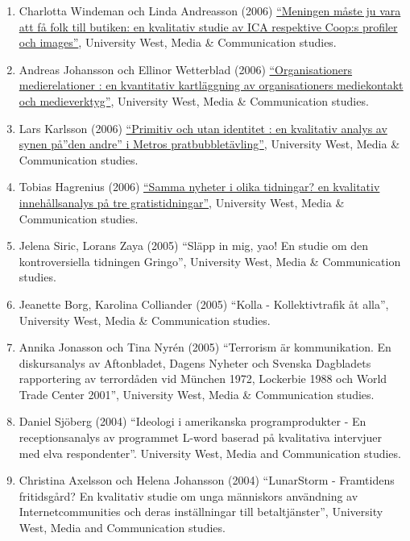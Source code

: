 \documentclass[
]{article}
\providecommand{\tightlist}{%
  \setlength{\itemsep}{0pt}\setlength{\parskip}{0pt}}
\begin{document}
\begin{enumerate}
\def\labelenumi{\arabic{enumi}.}
\tightlist
\item
  Charlotta Windeman och Linda Andreasson (2006)
  \href{http://urn.kb.se/resolve?urn=urn:nbn:se:hv:diva-846}{``Meningen
  måste ju vara att få folk till butiken: en kvalitativ studie av ICA
  respektive Coop:s profiler och images''}, University West, Media \&
  Communication studies.
\item
  Andreas Johansson och Ellinor Wetterblad (2006)
  \href{http://urn.kb.se/resolve?urn=urn:nbn:se:hv:diva-846}{``Organisationers
  medierelationer : en kvantitativ kartläggning av organisationers
  mediekontakt och medieverktyg''}, University West, Media \&
  Communication studies.
\item
  Lars Karlsson (2006)
  \href{http://www.uppsatser.se/uppsats/7e12f0e57f/}{``Primitiv och utan
  identitet : en kvalitativ analys av synen på''den andre'' i Metros
  pratbubbletävling''}, University West, Media \& Communication studies.
\item
  Tobias Hagrenius (2006)
  \href{http://urn.kb.se/resolve?urn=urn:nbn:se:hv:diva-851}{``Samma
  nyheter i olika tidningar? en kvalitativ innehållsanalys på tre
  gratistidningar''}, University West, Media \& Communication studies.
\item
  Jelena Siric, Lorans Zaya (2005) ``Släpp in mig, yao! En studie om den
  kontroversiella tidningen Gringo'', University West, Media \&
  Communication studies.
\item
  Jeanette Borg, Karolina Colliander (2005) ``Kolla - Kollektivtrafik åt
  alla'', University West, Media \& Communication studies.
\item
  Annika Jonasson och Tina Nyrén (2005) ``Terrorism är kommunikation. En
  diskursanalys av Aftonbladet, Dagens Nyheter och Svenska Dagbladets
  rapportering av terrordåden vid München 1972, Lockerbie 1988 och World
  Trade Center 2001'', University West, Media \& Communication studies.
\item
  Daniel Sjöberg (2004) ``Ideologi i amerikanska programprodukter - En
  receptionsanalys av programmet L-word baserad på kvalitativa
  intervjuer med elva respondenter''. University West, Media and
  Communication studies.
\item
  Christina Axelsson och Helena Johansson (2004) ``LunarStorm -
  Framtidens fritidsgård? En kvalitativ studie om unga människors
  användning av Internetcommunities och deras inställningar till
  betaltjänster'', University West, Media and Communication studies.
\end{enumerate}
\end{document}

